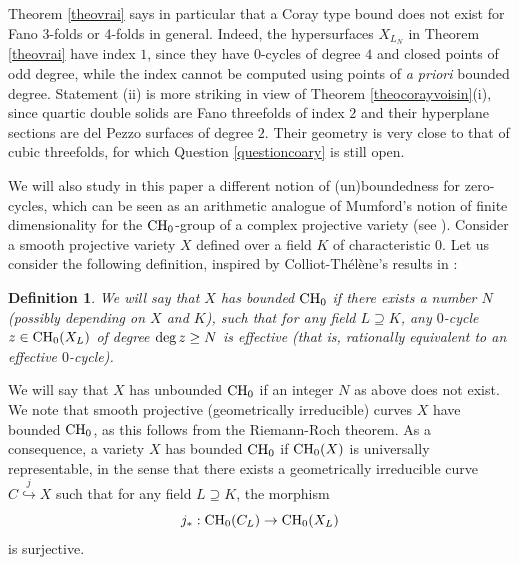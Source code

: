 \documentclass[10pt]{article}
\newtheorem{Defi}[theo]{Definition}
\begin{document}
Theorem \ref{theovrai} says in particular that a Coray type bound does not exist for Fano 3-folds or 4-folds  in general. Indeed, the hypersurfaces $X_{L_N}$ in Theorem \ref{theovrai} have index $1$, since they have $0$-cycles of degree $4$ and closed points of odd degree, while the index cannot be computed using points of {\it a priori} bounded degree.   Statement (ii) is more striking in view of Theorem \ref{theocorayvoisin}(i), since quartic double solids are Fano threefolds of index $2$ and their hyperplane sections are del Pezzo surfaces of degree $2$. Their geometry is very close to that of cubic threefolds, for which Question \ref{questioncoary} is still open.

 We will also study in this paper a   different  notion of (un)boundedness  for zero-cycles, which  can be seen as an arithmetic  analogue of Mumford's notion of  finite dimensionality for the ${\rm CH}_0$-group of a complex projective variety (see   \cite{mumford}).
 Consider  a smooth projective  variety $X$ defined over a field $K$ of characteristic $0$. Let us consider the following definition, inspired by Colliot-Th\'{e}l\`{e}ne's results  in \cite{colliot}:
\begin{Defi}\label{questionintro}  We will say that $X$ has bounded ${\rm CH}_0$  if  there exists a number $N$ (possibly depending on $X$ and $K$), such that for any field $L\supseteq K$, any $0$-cycle $z\in {\rm CH}_0(X_L)$  of  degree  ${\rm deg}\,z\geq N$ is effective (that is, rationally equivalent to an effective $0$-cycle).
\end{Defi}
We will say that $X$ has unbounded ${\rm CH}_0$  if an integer $N$ as above does not exist.
We note that  smooth projective (geometrically irreducible) curves $X$ have  bounded ${\rm CH}_0$, as this follows from the Riemann-Roch theorem. As a consequence,  a variety $X$ has bounded  ${\rm CH}_0$  if ${\rm CH}_0(X)$ is  universally representable, in the sense  that there exists a geometrically irreducible curve $C\stackrel{j}{\hookrightarrow} X$ such that for any field $L\supseteq K$, the morphism
$$j_*:{\rm CH}_0(C_L)\rightarrow  {\rm CH}_0(X_L)$$
is surjective.
\end{document}
